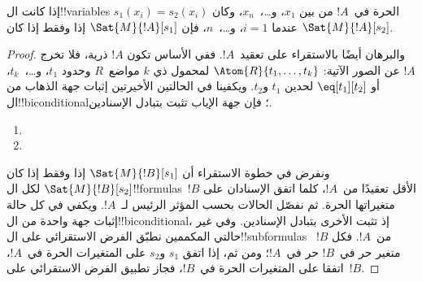 \documentclass[../../../include/open-logic-section]{subfiles}
\begin{document}
\begin{prop}
إذا كانت ال!!{variable}s الحرة في~$!A$ من بين $x_1$، و\dots،~$x_n$،
وكان $s_1(x_i) = s_2(x_i)$ عندما $i = 1$، و\dots،~$n$، فإن
$\Sat{M}{!A}[s_1]$ إذا وفقط إذا كان $\Sat{M}{!A}[s_2]$.
\end{prop}

\begin{proof}
والبرهان أيضًا بالاستقراء على تعقيد~$!A$. ففي الأساس تكون $!A$
ذرية، فلا تخرج $!A$ عن الصور الآتية:
$\Atom{R}{t_1, \dots, t_k}$ لمحمول ذي $k$ مواضع~$R$
وحدود $t_1$، و\dots،~$t_k$، أو $\eq[t_1][t_2]$ لحدين $t_1$
و$t_2$. ويكفينا في الحالتين الأخيرتين إثبات جهة الذهاب من
ال!!{biconditional}؛ فإن جهة الإياب تثبت بتبادل الإسنادين.

\begin{enumerate}


\item
\item
\end{enumerate}

ونفرض في خطوة الاستقراء أن $\Sat{M}{!B}[s_1]$ إذا وفقط إذا كان
$\Sat{M}{!B}[s_2]$ لكل ال!!{formula}s~$!B$ الأقل تعقيدًا من~$!A$،
كلما اتفق الإسنادان على متغيراتها الحرة. ثم نفصّل الحالات بحسب
المؤثر الرئيس لـ~$!A$. ويكفي في كل حالة إثبات جهة واحدة من
ال!!{biconditional}، إذ تثبت الأخرى بتبادل الإسنادين. وفي غير
حالتي المكممين نطبّق الفرض الاستقرائي على ال!!{subformula}s
~$!B$ من~$!A$. فكل متغير حر في~$!B$ حر في~$!A$؛ ومن ثم، إذا
اتفق $s_1$ و$s_2$ على المتغيرات الحرة في~$!A$، اتفقا على المتغيرات
الحرة في~$!B$، فجاز تطبيق الفرض الاستقرائي على~$!B$.


\end{proof}
\end{document}
